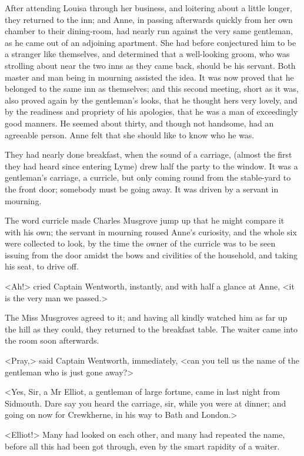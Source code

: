 After attending Louisa through her business, and loitering about a little longer, they returned to the inn; and Anne, in passing afterwards quickly from her own chamber to their dining-room, had nearly run against the very same gentleman, as he came out of an adjoining apartment. She had before conjectured him to be a stranger like themselves, and determined that a well-looking groom, who was strolling about near the two inns as they came back, should be his servant. Both master and man being in mourning assisted the idea. It was now proved that he belonged to the same inn as themselves; and this second meeting, short as it was, also proved again by the gentleman's looks, that he thought hers very lovely, and by the readiness and propriety of his apologies, that he was a man of exceedingly good manners. He seemed about thirty, and though not handsome, had an agreeable person. Anne felt that she should like to know who he was.

They had nearly done breakfast, when the sound of a carriage, (almost the first they had heard since entering Lyme) drew half the party to the window. It was a gentleman's carriage, a curricle, but only coming round from the stable-yard to the front door; somebody must be going away. It was driven by a servant in mourning.

The word curricle made Charles Musgrove jump up that he might compare it with his own; the servant in mourning roused Anne's curiosity, and the whole six were collected to look, by the time the owner of the curricle was to be seen issuing from the door amidst the bows and civilities of the household, and taking his seat, to drive off.

<Ah!> cried Captain Wentworth, instantly, and with half a glance at Anne, <it is the very man we passed.>

The Miss Musgroves agreed to it; and having all kindly watched him as far up the hill as they could, they returned to the breakfast table. The waiter came into the room soon afterwards.

<Pray,> said Captain Wentworth, immediately, <can you tell us the name of the gentleman who is just gone away?>

<Yes, Sir, a Mr Elliot, a gentleman of large fortune, came in last night from Sidmouth. Dare say you heard the carriage, sir, while you were at dinner; and going on now for Crewkherne, in his way to Bath and London.>

<Elliot!> Many had looked on each other, and many had repeated the name, before all this had been got through, even by the smart rapidity of a waiter.

